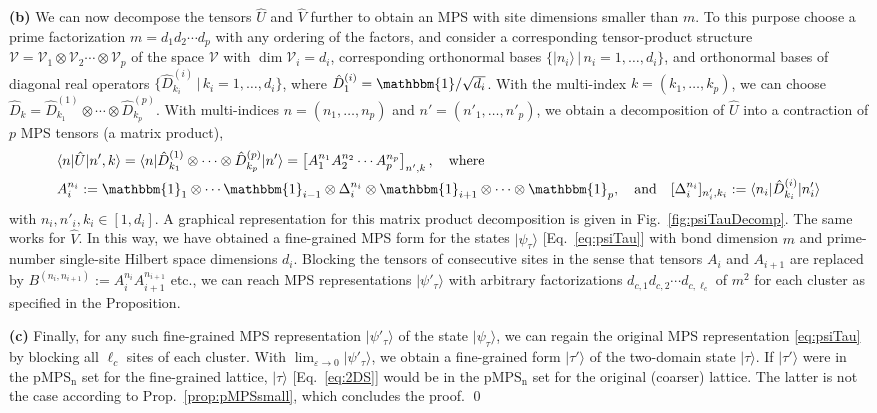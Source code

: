 \documentclass[english,11pt,aps,pra,onecolumn,tightenlines,groupedaddress,superscriptaddress,notitlepage,floatfix,fleqn]{revtex4-1}
\newcommand{\id}{\mathbbm{1}}
\newcommand{\bra}{\langle}
\newcommand{\ket}{\rangle}
\newcommand{\hD}{\hat{D}}
\newcommand{\hU}{\hat{U}}
\newcommand{\hV}{\hat{V}}
\newcommand{\mc}[1]{\mathcal{#1}}
\newcommand{\V}{\mc{V}}
\newcommand{\pMPSn}{\operatorname{pMPS_n}}
\newcommand{\veps}{\varepsilon}
\begin{document}
\textbf{(b)} We can now decompose the tensors $\hU$ and $\hV$ further to obtain an MPS with site dimensions smaller than $m$. To this purpose choose a prime factorization $m=d_1d_2\dotsb d_p$ with any ordering of the factors, and consider a corresponding tensor-product structure $\V=\V_1\otimes\V_2\dotsb\otimes\V_p$ of the space $\V$ with $\dim\V_i=d_i$, corresponding orthonormal bases $\{|n_i\ket\,|\,n_i=1,\dotsc,d_i\}$, and orthonormal bases of diagonal real operators $\{\hD^{(i)}_{k_i}\,|\,k_i=1,\dotsc,d_i\}$, where $\hD^{(i)}_{1}=\id/\sqrt{d_i}$. With the multi-index $k=(k_1,\dotsc,k_p)$, we can choose $\hD_k=\hD^{(1)}_{k_1}\otimes\dotsb\otimes \hD^{(p)}_{k_{p}}$. With multi-indices $n=(n_1,\dotsc,n_p)$ and $n'=(n'_1,\dotsc,n'_p)$, we obtain a decomposition of $\hU$ into a contraction of $p$ MPS tensors (a matrix product),
\begin{subequations}\label{eq:psiTauUdecomp}
\begin{align}
	&\bra n|\hU|n',k\ket=\bra n|\hD^{(1)}_{k_1}\otimes\dotsb\otimes \hD^{(p)}_{k_{p}}|n'\ket
	=\left[A^{n_1}_1 A^{n_2}_2 \dotsb A^{n_p}_p\right]_{n',k},\quad\text{where}\\
	&A^{n_i}_i:=\id_1\otimes\dotsb\id_{i-1}\otimes \Delta^{n_i}_i\otimes\id_{i+1}\otimes\dotsb\otimes\id_{p},\quad\text{and}\quad
	[\Delta^{n_i}_i]_{n'_i,k_i}:=\bra n_i|\hD^{(i)}_{k_i}|n'_i\ket
\end{align}
\end{subequations}
with $n_i,n'_i,k_i\in[1,d_i]$.
A graphical representation for this matrix product decomposition is given in Fig.~\ref{fig:psiTauDecomp}. The same works for $\hV$. In this way, we have obtained a fine-grained MPS form for the states $|\psi_\tau\ket$ [Eq.~\eqref{eq:psiTau}] with bond dimension $m$ and prime-number single-site Hilbert space dimensions $d_i$. Blocking the tensors of consecutive sites in the sense that tensors $A_i$ and $A_{i+1}$ are replaced by
$B^{(n_i,n_{i+1})}:=A^{n_i}_iA^{n_{i+1}}_{i+1}$ etc., we can reach MPS representations $|\psi'_\tau\ket$ with arbitrary factorizations $d_{c,1}d_{c,2}\dotsb d_{c,\ell_c}$ of $m^2$ for each cluster as specified in the Proposition.

\textbf{(c)} Finally, for any such fine-grained MPS representation $|\psi'_\tau\ket$ of the state $|\psi_\tau\ket$, we can regain the original MPS representation \eqref{eq:psiTau} by blocking all $\ell_c$ sites of each cluster. With $\lim_{\veps\to 0}|\psi'_\tau\ket$, we obtain a fine-grained form $|\tau'\ket$ of the two-domain state $|\tau\ket$. If $|\tau'\ket$ were in the $\pMPSn$ set for the fine-grained lattice, $|\tau\ket$ [Eq.~\eqref{eq:2DS}] would be in the $\pMPSn$ set for the original (coarser) lattice. The latter is not the case according to Prop.~\ref{prop:pMPSsmall}, which concludes the proof. \qed
\end{document}

